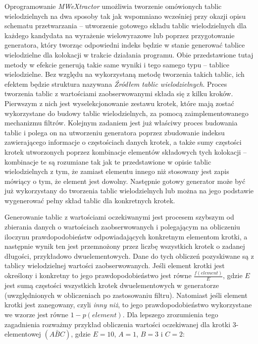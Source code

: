 \documentclass[11pt,a4paper]{llncs}
\begin{document}
Oprogramowanie \emph{MWeXtractor} umożliwia tworzenie omówionych tablic wielodzielnych na dwa sposoby tak jak wspomniano wcześniej przy okazji opisu schematu przetwarzania -- utworzenie gotowego składu tablic wielodzielnych dla każdego kandydata na wyrażenie wielowyrazowe lub poprzez przygotowanie generatora, który tworząc odpowiedni indeks będzie w stanie generować tablice wielodzielne dla kolokacji w trakcie działania programu.
Obie przedstawione tutaj metody w efekcie generują takie same wyniki i tego samego typu -- tablice wielodzielne.
Bez względu na wykorzystaną metodę tworzenia takich tablic, ich efektem będzie struktura nazywana \emph{Źródłem tablic wielodzielnych}.
Proces tworzenia tablic z wartościami zaobserwowanymi składa się z kilku kroków.
Pierwszym z nich jest wyselekcjonowanie zestawu krotek, które mają zostać wykorzystane do budowy tablic wielodzielnych, za pomocą zaimplementowanego mechanizmu filtrów.
Kolejnym zadaniem jest już właściwy proces budowania tablic i polega on na utworzeniu generatora poprzez zbudowanie indeksu zawierającego informacje o częstościach danych krotek, a także sumy częstości krotek utworzonych poprzez kombinacje elementów składowych tych kolokacji -- kombinacje te są rozumiane tak jak te przedstawione w opisie tablic wielodzielnych z tym, że zamiast elementu innego niż stosowany jest zapis mówiący o tym, że element jest dowolny.
Następnie gotowy generator może być już wykorzystany do tworzenia tablic wielodzielnych lub można na jego podstawie wygenerować pełny skład tablic dla konkretnych krotek.
\par
Generowanie tablic z wartościami oczekiwanymi jest procesem szybszym od zbierania danych o wartościach zaobserwowanych i polegającym na obliczeniu iloczynu prawdopodobieństw odpowiadających konkretnym elementom krotki, a następnie wynik ten jest przemnożony przez liczbę wszystkich krotek o zadanej długości, przykładowo dwuelementowych.
Dane do tych obliczeń pozyskiwane są z tablicy wielodzielnej wartości zaobserwowanych.
Jeśli element krotki jest określony i konkretny to jego prawdopodobieństwo jest równe $ \frac{f(element)}{E} $, gdzie $ E $ jest sumą częstości wszystkich krotek dwuelementowych w generatorze (uwzględnionych w obliczeniach po zastosowaniu filtru).
Natomiast jeśli element krotki jest zanegowany, czyli \emph{inny niż}, to jego prawdopodobieństwo wykorzystane we wzorze jest równe $ 1 - p(element) $.
Dla lepszego zrozumienia tego zagadnienia rozważmy przykład obliczenia wartości oczekiwanej dla krotki 3-elementowej $ (A \bar{B} C) $, gdzie $ E = 10 $, $ A = 1 $, $ B = 3 $ i $ C = 2 $:
\end{document}
